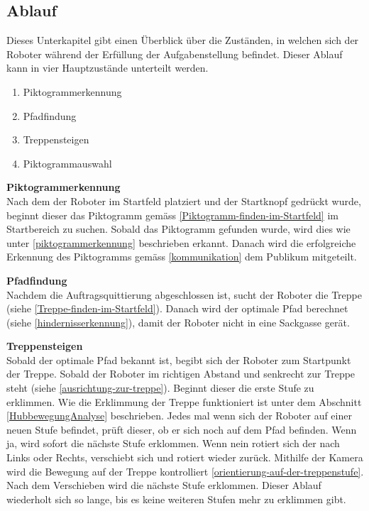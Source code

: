 \newpage

\subsection{Ablauf}

Dieses Unterkapitel gibt einen Überblick über die Zuständen, in welchen sich der Roboter während der Erfüllung der Aufgabenstellung befindet. Dieser Ablauf kann in vier Hauptzustände unterteilt werden. 
\begin{enumerate}
    \item Piktogrammerkennung
    \item Pfadfindung
    \item Treppensteigen
    \item Piktogrammauswahl
\end{enumerate}

\textbf{Piktogrammerkennung}\\
Nach dem der Roboter im Startfeld platziert und der Startknopf gedrückt wurde, beginnt dieser das Piktogramm gemäss \ref{Piktogramm-finden-im-Startfeld} im Startbereich zu suchen. Sobald das Piktogramm gefunden wurde, wird dies wie unter \ref{piktogrammerkennung} beschrieben erkannt. Danach wird die erfolgreiche Erkennung des Piktogramms gemäss \ref{kommunikation} dem Publikum mitgeteilt. 

\textbf{Pfadfindung}\\
Nachdem die Auftragsquittierung abgeschlossen ist, sucht der Roboter die Treppe (siehe \ref{Treppe-finden-im-Startfeld}). Danach wird der optimale Pfad berechnet (siehe \ref{hindernisserkennung}), damit der Roboter nicht in eine Sackgasse gerät. 

\textbf{Treppensteigen}\\
Sobald der optimale Pfad bekannt ist, begibt sich der Roboter zum Startpunkt der Treppe.  Sobald der Roboter im richtigen Abstand und senkrecht zur Treppe steht (siehe \ref{ausrichtung-zur-treppe}). Beginnt dieser die erste Stufe zu erklimmen. Wie die Erklimmung der Treppe funktioniert ist unter dem Abschnitt \ref{HubbewegungAnalyse} beschrieben. Jedes mal wenn sich der Roboter auf einer neuen Stufe befindet, prüft dieser, ob er sich noch auf dem Pfad befinden. Wenn ja, wird sofort die nächste Stufe erklommen. Wenn nein rotiert sich der nach Links oder Rechts, verschiebt sich und rotiert wieder zurück. Mithilfe der Kamera wird die Bewegung auf der Treppe kontrolliert \ref{orientierung-auf-der-treppenstufe}. Nach dem Verschieben wird die nächste Stufe erklommen. Dieser Ablauf wiederholt sich so lange, bis es keine weiteren Stufen mehr zu erklimmen gibt.

